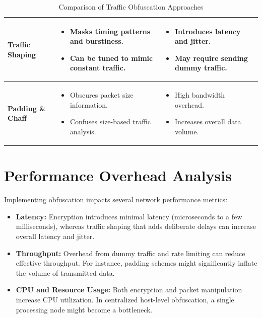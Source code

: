 \documentclass{article}
\begin{document}
\begin{table}[ht]
\begin{tabularx}{\linewidth}{|p{2.5cm}|X|X|}
\hline
\textbf{Traffic Shaping} & 
\begin{itemize}[leftmargin=*,noitemsep]
    \item Masks timing patterns and burstiness.
    \item Can be tuned to mimic constant traffic.
\end{itemize} & 
\begin{itemize}[leftmargin=*,noitemsep]
    \item Introduces latency and jitter.
    \item May require sending dummy traffic.
\end{itemize} \\
\hline
\textbf{Padding \& Chaff} & 
\begin{itemize}[leftmargin=*,noitemsep]
    \item Obscures packet size information.
    \item Confuses size-based traffic analysis.
\end{itemize} & 
\begin{itemize}[leftmargin=*,noitemsep]
    \item High bandwidth overhead.
    \item Increases overall data volume.
\end{itemize} \\
\hline
\end{tabularx}
\caption{Comparison of Traffic Obfuscation Approaches}
\label{tab:methods}
\end{table}

\section{Performance Overhead Analysis}
Implementing obfuscation impacts several network performance metrics:
\begin{itemize}[noitemsep]
    \item \textbf{Latency:} Encryption introduces minimal latency (microseconds to a few milliseconds), whereas traffic shaping that adds deliberate delays can increase overall latency and jitter.
    \item \textbf{Throughput:} Overhead from dummy traffic and rate limiting can reduce effective throughput. For instance, padding schemes might significantly inflate the volume of transmitted data.
    \item \textbf{CPU and Resource Usage:} Both encryption and packet manipulation increase CPU utilization. In centralized host-level obfuscation, a single processing node might become a bottleneck.
\end{itemize}
\end{document}

